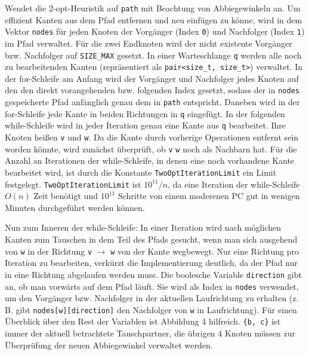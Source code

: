 \documentclass[a4paper, 10pt, ngerman]{article}
\begin{document}
\noindent Wendet die 2-opt-Heuristik auf \verb|path| mit Beachtung von Abbiegewinkeln an. Um effizient Kanten aus dem Pfad entfernen und neu einfügen zu könne, wird in dem Vektor \verb|nodes| für jeden Knoten der Vorgänger (Index \verb|0|) und Nachfolger (Index \verb|1|) im Pfad verwaltet. Für die zwei Endknoten wird der nicht existente Vorgänger bzw. Nachfolger auf \verb|SIZE_MAX| gesetzt. In einer Warteschlange \verb|q| werden alle noch zu bearbeitenden Kanten (repräsentiert als \verb|pair<size_t, size_t>|) verwaltet. In der for-Schleife am Anfang wird der Vorgänger und Nachfolger jedes Knoten auf den den direkt vorangehenden bzw. folgenden Index gesetzt, sodass der in \verb|nodes| gespeicherte Pfad anfänglich genau dem in \verb|path| entspricht. Daneben wird in der for-Schleife jede Kante in beiden Richtungen in \verb|q| eingefügt. In der folgenden while-Schleife wird in jeder Iteration genau eine Kante aus \verb|q| bearbeitet. Ihre Knoten heißen \verb|v| und \verb|w|. Da die Kante durch vorherige Operationen entfernt sein worden könnte, wird zunächst überprüft, ob \verb|v| \verb|w| noch als Nachbarn hat. Für die Anzahl an Iterationen der while-Schleife, in denen eine noch vorhandene Kante bearbeitet wird, ist durch die Konstante \verb|TwoOptIterationLimit| ein Limit festgelegt. \verb|TwoOptIterationLimit| ist $10^{11} / n$, da eine Iteration der while-Schleife $O(n)$ Zeit benötigt und $10^{11}$ Schritte von einem moderenen PC gut in wenigen Minuten durchgeführt werden können.

Nun zum Inneren der while-Schleife:  In einer Iteration wird nach möglichen Kanten zum Tauschen in dem Teil des Pfads gesucht, wenn man sich ausgehend von \verb|w| in der Richtung \verb|v| $\rightarrow$ \verb|w| von der Kante wegbewegt. Nur eine Richtung pro Iteration zu bearbeiten, verkürzt die Implementierung deutlich, da der Pfad nur in eine Richtung abgelaufen werden muss. Die boolesche Variable \verb|direction| gibt an, ob man vorwärts auf dem Pfad läuft. Sie wird als Index in \verb|nodes| verwendet, um den Vorgänger bzw. Nachfolger in der aktuellen Laufrichtung zu erhalten (z. B. gibt \verb|nodes[w][direction]| den Nachfolger von \verb|w| in Laufrichtung). Für einen Überblick über den Rest der Variablen ist Abbildung 4 hilfreich. \verb|{b, c}| ist immer der aktuell betrachtete Tauschpartner, die übrigen 4 Knoten müssen zur Überprüfung der neuen Abbiegewinkel verwaltet werden.
\bigskip
\end{document}
